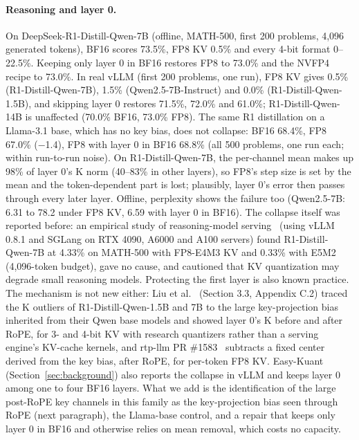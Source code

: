 \documentclass[11pt]{article}
\begin{document}
\paragraph{Reasoning and layer 0.} On DeepSeek-R1-Distill-Qwen-7B (offline, MATH-500, first 200 problems, 4,096 generated tokens), BF16 scores 73.5\%, FP8 KV 0.5\% and every 4-bit format 0--22.5\%. Keeping only layer 0 in BF16 restores FP8 to 73.0\% and the NVFP4 recipe to 73.0\%. In real vLLM (first 200 problems, one run), FP8 KV gives 0.5\% (R1-Distill-Qwen-7B), 1.5\% (Qwen2.5-7B-Instruct) and 0.0\% (R1-Distill-Qwen-1.5B), and skipping layer 0 restores 71.5\%, 72.0\% and 61.0\%; R1-Distill-Qwen-14B is unaffected (70.0\% BF16, 73.0\% FP8). The same R1 distillation on a Llama-3.1 base, which has no key bias, does not collapse: BF16 68.4\%, FP8 67.0\% ($-$1.4), FP8 with layer 0 in BF16 68.8\% (all 500 problems, one run each; within run-to-run noise). On R1-Distill-Qwen-7B, the per-channel mean makes up 98\% of layer 0's K norm (40--83\% in other layers), so FP8's step size is set by the mean and the token-dependent part is lost; plausibly, layer 0's error then passes through every later layer. Offline, perplexity shows the failure too (Qwen2.5-7B: 6.31 to 78.2 under FP8 KV, 6.59 with layer 0 in BF16). The collapse itself was reported before: an empirical study of reasoning-model serving~\cite{li2025rllmserving} (using vLLM 0.8.1 and SGLang on RTX 4090, A6000 and A100 servers) found R1-Distill-Qwen-7B at 4.33\% on MATH-500 with FP8-E4M3 KV and 0.33\% with E5M2 (4,096-token budget), gave no cause, and cautioned that KV quantization may degrade small reasoning models. Protecting the first layer is also known practice. The mechanism is not new either: Liu et al.~\cite{liu2025quantreasoning} (Section 3.3, Appendix C.2) traced the K outliers of R1-Distill-Qwen-1.5B and 7B to the large key-projection bias inherited from their Qwen base models and showed layer 0's K before and after RoPE, for 3- and 4-bit KV with research quantizers rather than a serving engine's KV-cache kernels, and rtp-llm PR \#1583~\cite{rtpllm1583} subtracts a fixed center derived from the key bias, after RoPE, for per-token FP8 KV. Easy-Kuant~\cite{easykuant2026} (Section~\ref{sec:background}) also reports the collapse in vLLM and keeps layer 0 among one to four BF16 layers. What we add is the identification of the large post-RoPE key channels in this family as the key-projection bias seen through RoPE (next paragraph), the Llama-base control, and a repair that keeps only layer 0 in BF16 and otherwise relies on mean removal, which costs no capacity.
\end{document}
